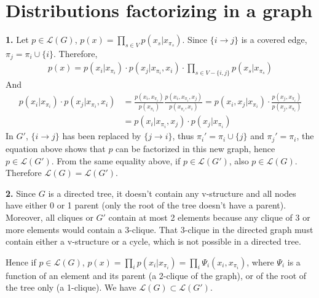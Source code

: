\documentclass[12pt, oneside]{amsart}   	%
\begin{document}
 \section{Distributions factorizing in a graph}
 \textbf{1.} Let $p\in\mathcal{L}(G)$, $p(x) = \prod_{s\in V} p(x_s|x_{\pi_s})$. Since $\{i\rightarrow j\}$ is a covered edge,  $\pi_j = \pi_i \cup \{i\}$. Therefore,
 \begin{align*}
 p(x) = p(x_i|x_{\pi_i})\cdot p(x_j|x_{\pi_i}, x_i) \cdot\prod_{s\in V-\{ i, j \}} p(x_s|x_{\pi_s})
 \end{align*}
 And 
 \begin{align*}
 p(x_i|x_{\pi_i})\cdot p(x_j|x_{\pi_i}, x_i) &= \frac{p(x_i, x_{\pi_i})}{p(x_{\pi_i})} \frac{p(x_i, x_{\pi_i}, x_j)}{p(x_{\pi_i}, x_i)} =p(x_i,  x_j |x_{\pi_i})\cdot \frac{p(x_j, x_{\pi_i})}{p(x_j, x_{\pi_i})}\\
 & = p(x_i | x_{\pi_i}, x_j)\cdot p(x_j|x_{\pi_i})
 \end{align*}
 In $G'$, $\{i\rightarrow j\}$ has been replaced by $\{j\rightarrow i\}$, thus $\pi_i' = \pi_i \cup \{j\}$ and $\pi_j' = \pi_i $, the equation above shows that $p$ can be factorized in this new graph, hence $p\in \mathcal{L}(G')$. From the same equality above, if $p\in \mathcal{L}(G')$, also $p\in \mathcal{L}(G)$. Therefore $\boxed{ \mathcal{L}(G) =  \mathcal{L}(G')}$.
 \vspace{0.5cm}
 
 \textbf{2.} Since $G$ is a directed tree, it doesn't contain any v-structure and all nodes have either 0 or 1 parent (only the root of the tree doesn't have a parent). Moreover, all cliques or $G'$ contain at most 2 elements because any clique of 3 or more elements would contain a 3-clique. That 3-clique in the directed graph must contain either a v-structure or a cycle, which is not possible in a directed tree. 
 
 Hence if $p\in \mathcal{L}(G)$, $p(x) = \prod_i p(x_i | x_{\pi_i}) = \prod_i \Psi_i(x_i, x_{\pi_i})$, where $\Psi_i$ is a function of an element and its parent (a 2-clique of the graph), or of the root of the tree only (a 1-clique). We have $\boxed{\mathcal{L}(G) \subset \mathcal{L}(G')}$.
 
 
 
\end{document}
